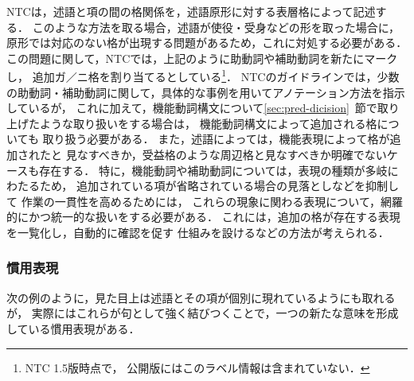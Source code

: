 \documentclass[japanese]{jnlp_1.4}
\begin{document}
NTCは，述語と項の間の格関係を，述語原形に対する表層格によって記述する．
このような方法を取る場合，述語が使役・受身などの形を取った場合に，
原形では対応のない格が出現する問題があるため，これに対処する必要がある．
この問題に関して，NTCでは，上記のように助動詞や補助動詞を新たにマークし，
追加ガ／ニ格を割り当てるとしている\footnote{NTC 1.5版時点で，
公開版にはこのラベル情報は含まれていない．}．
NTCのガイドラインでは，少数の助動詞・補助動詞に関して，具体的な事例を用いてアノテーション方法を指示しているが，
これに加えて，機能動詞構文について\ref{sec:pred-dicision}~節で取り上げたような取り扱いをする場合は，
機能動詞構文によって追加される格についても
取り扱う必要がある．
また，述語によっては，機能表現によって格が追加されたと
見なすべきか，受益格のような周辺格と見なすべきか明確でないケースも存在する．
特に，機能動詞や補助動詞については，表現の種類が多岐にわたるため，
追加されている項が省略されている場合の見落としなどを抑制して
作業の一貫性を高めるためには，
これらの現象に関わる表現について，網羅的にかつ統一的な扱いをする必要がある．
これには，追加の格が存在する表現を一覧化し，自動的に確認を促す
仕組みを設けるなどの方法が考えられる．


\subsubsection{慣用表現}
\label{sec:idioms}

次の例のように，見た目上は述語とその項が個別に現れているようにも取れるが，
実際にはこれらが句として強く結びつくことで，一つの新たな意味を形成している慣用表現がある．
\end{document}
